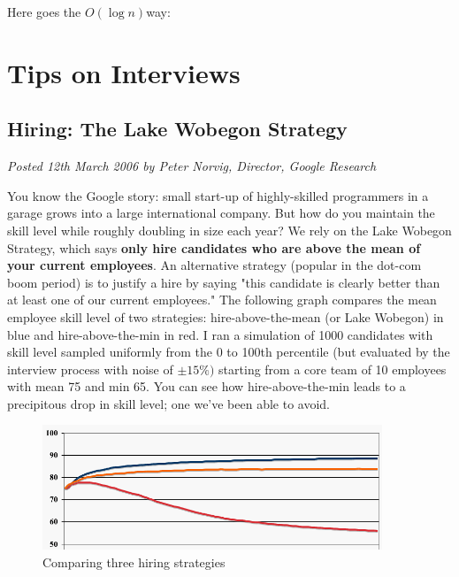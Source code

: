 \documentclass[12pt, reqno, oneside]{amsart}
\begin{document}
Here goes the  $O(\log n)$way:




\section{Tips on Interviews}

\subsection{Hiring: The Lake Wobegon Strategy}
\textit{Posted 12th March 2006 by Peter Norvig, Director, Google Research}

You know the Google story: small start-up of highly-skilled programmers in a garage grows into a large international company. But how do you maintain the skill level while roughly doubling in size each year? We rely on the Lake Wobegon Strategy, which says \textbf{only hire candidates who are above the mean of your current employees}. An alternative strategy (popular in the dot-com boom period) is to justify a hire by saying "this candidate is clearly better than at least one of our current employees." The following graph compares the mean employee skill level of two strategies: hire-above-the-mean (or Lake Wobegon) in blue and hire-above-the-min in red. I ran a simulation of 1000 candidates with skill level sampled uniformly from the 0 to 100th percentile (but evaluated by the interview process with noise of $\pm15\%)$ starting from a core team of 10 employees with mean 75 and min 65. You can see how hire-above-the-min leads to a precipitous drop in skill level; one we've been able to avoid.

\begin{figure}[htbp] %
   \centering
   \includegraphics[width=4in]{figs/google-hire.png} 
   \caption{Comparing three hiring strategies}
   \label{fig:google_hire}
\end{figure}
\end{document}
